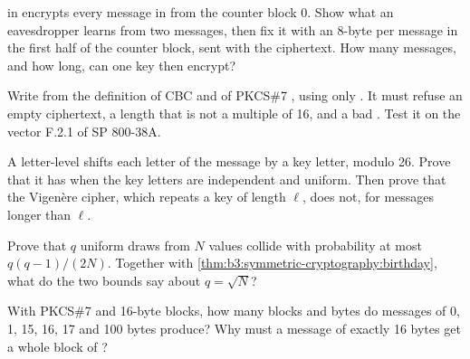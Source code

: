 \begin{exercise}[$\star\star$]\label{exo:b3:symmetric-cryptography:5}
 in  encrypts every message in  from the counter block 0. Show what an eavesdropper learns from two messages, then fix it with an 8-byte  per message in the first half of the counter block, sent with the ciphertext. How many messages, and how long, can one key then encrypt?
\end{exercise}

\begin{exercise}[$\star\star$]\label{exo:b3:symmetric-cryptography:6}
Write  from the definition of CBC and of PKCS\#7 , using only . It must refuse an empty ciphertext, a length that is not a multiple of 16, and a bad . Test it on the vector F.2.1 of SP 800-38A.
\end{exercise}

\begin{exercise}[$\star\star$]\label{exo:b3:symmetric-cryptography:7}
A letter-level  shifts each letter of the message by a key letter, modulo 26. Prove that it has  when the key letters are independent and uniform. Then prove that the Vigenère cipher, which repeats a key of length $\ell$, does not, for messages longer than $\ell$.
\end{exercise}

\begin{exercise}[$\star\star$]\label{exo:b3:symmetric-cryptography:8}
Prove that $q$ uniform draws from $N$ values collide with probability at most $q(q - 1)/(2N)$. Together with \cref{thm:b3:symmetric-cryptography:birthday}, what do the two bounds say about $q = \sqrt{N}$?
\end{exercise}

\begin{exercise}[$\star\star$]\label{exo:b3:symmetric-cryptography:9}
With PKCS\#7  and 16-byte blocks, how many blocks and  bytes do messages of 0, 1, 15, 16, 17 and 100 bytes produce? Why must a message of exactly 16 bytes get a whole block of ?
\end{exercise}

